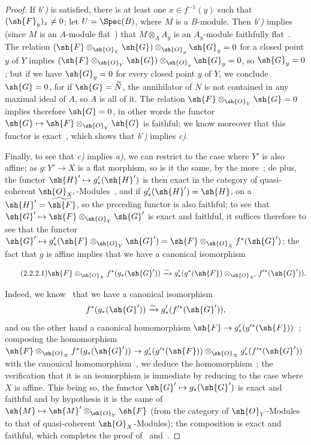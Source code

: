 \begin{proof}
If \emph{b$'$)} is satisfied, there is at least one $x\in f^{-1}(y)$ such that $(\sh{F}_y)_x\neq 0$; let $U=\Spec(B)$, where $M$ is a $B$-module.
Then \emph{b$'$)} implies (since $M$ is an $A$-module flat~) that $M\otimes_A A_y$ is an $A_y$-module faithfully flat~.
The relation $(\sh{F}\otimes_{\sh{O}_Y}\sh{G})\otimes_{\sh{O}_y}\sh{G}_y=0$ for a closed point $y$ of $Y$ implies $(\sh{F}\otimes_{\sh{O}_Y}\sh{G})\otimes_{\sh{O}_y}\sh{G}_y=0$, so $\sh{G}_y=0$; but if we have $\sh{G}_y=0$ for every closed point $y$ of $Y$, we conclude $\sh{G}=0$, for if $\sh{G}=\widetilde{N}$, the annihilator of $N$ is not contained in any maximal ideal of $A$, so $A$ is all of it.
The relation $\sh{F}\otimes_{\sh{O}_Y}\sh{G}=0$ implies therefore $\sh{G}=0$, in other words the functor $\sh{G}\mapsto\sh{F}\otimes_{\sh{O}_Y}\sh{G}$ is faithful; we know moreover that this functor is exact~, which shows that \emph{b$'$)} implies \emph{c)}.

Finally, to see that \emph{c)} implies \emph{a)}, we can restrict to the case where $Y'$ is also affine;
as $g:Y'\to X$ is a flat morphism, so is it the same, by the more~; de plus, the functor $\sh{H}'\mapsto g'_*(\sh{H}')$ is then exact in the category of quasi-coherent $\sh{O}_{X'}$-Modules~, and if $g'_*(\sh{H}')=\sh{H}$, on a $\sh{H}'=\widetilde{\sh{F}}$, so the preceding functor is also faithful; to see that $\sh{G}'\mapsto\sh{F}\otimes_{\sh{O}_Y}\sh{G}'$ is exact and faithful, it suffices therefore to see that the functor $\sh{G}'\mapsto g'_*(\sh{F}\otimes_{\sh{O}_Y}\sh{G}')=\sh{F}\otimes_{\sh{O}_X}f^*(\sh{G}')$; the fact that $g$ is affine implies that we have a canonical isomorphism

\begin{equation}
\tag{2.2.2.1}
\label{IV.2.2.2.1}
  \sh{F}\otimes_{\sh{O}_X}f^*(g_*(\sh{G}'))\xrightarrow{\sim} g'_*(g^*(\sh{F})\otimes_{\sh{O}_{X'}}f'^*(\sh{G}')).
\end{equation}

Indeed, we know~ that we have a canonical isomorphism
\[
  f^*(g_*(\sh{G}'))\xrightarrow{\sim} g'_*(f'^*(\sh{G}')),
\]
and on the other hand a canonical homomorphism $\sh{F}\to g'_*(g'^*(\sh{F}))$~; composing the homomorphism $\sh{F}\otimes_{\sh{O}_X}f^*(g_*(\sh{G}'))\to g'_*(g'^*(\sh{F}))\otimes_{\sh{O}_X}g'_*(f'^*(\sh{G}'))$ with the canonical homomorphism~, we deduce the homomorphism~; the verification that it is an isomorphism is immediate by reducing to the case where $X$ is affine.
This being so, the functor $\sh{G}'\mapsto g_*(\sh{G}')$ is exact and faithful and by hypothesis it is the same of $\sh{M}\mapsto\sh{M}'\otimes_{\sh{O}_Y}\sh{F}$ (from the category of $\sh{O}_Y$-Modules to that of quasi-coherent $\sh{O}_X$-Modules); the composition is exact and faithful, which completes the proof of~ and~.
\end{proof}

